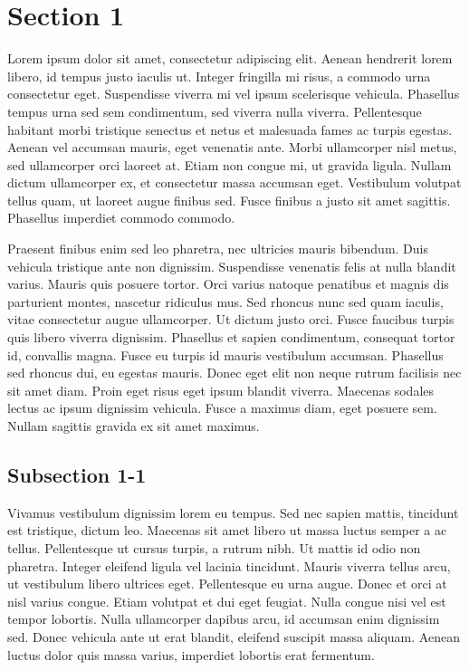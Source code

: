 \section{Section 1}
Lorem ipsum dolor sit amet, consectetur adipiscing elit. Aenean hendrerit lorem libero, id tempus justo iaculis ut. Integer fringilla mi risus, a commodo urna consectetur eget. Suspendisse viverra mi vel ipsum scelerisque vehicula. Phasellus tempus urna sed sem condimentum, sed viverra nulla viverra. Pellentesque habitant morbi tristique senectus et netus et malesuada fames ac turpis egestas. Aenean vel accumsan mauris, eget venenatis ante. Morbi ullamcorper nisl metus, sed ullamcorper orci laoreet at. Etiam non congue mi, ut gravida ligula. Nullam dictum ullamcorper ex, et consectetur massa accumsan eget. Vestibulum volutpat tellus quam, ut laoreet augue finibus sed. Fusce finibus a justo sit amet sagittis. Phasellus imperdiet commodo commodo.

Praesent finibus enim sed leo pharetra, nec ultricies mauris bibendum. Duis vehicula tristique ante non dignissim. Suspendisse venenatis felis at nulla blandit varius. Mauris quis posuere tortor. Orci varius natoque penatibus et magnis dis parturient montes, nascetur ridiculus mus. Sed rhoncus nunc sed quam iaculis, vitae consectetur augue ullamcorper. Ut dictum justo orci. Fusce faucibus turpis quis libero viverra dignissim. Phasellus et sapien condimentum, consequat tortor id, convallis magna. Fusce eu turpis id mauris vestibulum accumsan. Phasellus sed rhoncus dui, eu egestas mauris. Donec eget elit non neque rutrum facilisis nec sit amet diam. Proin eget risus eget ipsum blandit viverra. Maecenas sodales lectus ac ipsum dignissim vehicula. Fusce a maximus diam, eget posuere sem. Nullam sagittis gravida ex sit amet maximus.

\subsection{Subsection 1-1}
Vivamus vestibulum dignissim lorem eu tempus. Sed nec sapien mattis, tincidunt est tristique, dictum leo. Maecenas sit amet libero ut massa luctus semper a ac tellus. Pellentesque ut cursus turpis, a rutrum nibh. Ut mattis id odio non pharetra. Integer eleifend ligula vel lacinia tincidunt. Mauris viverra tellus arcu, ut vestibulum libero ultrices eget. Pellentesque eu urna augue. Donec et orci at nisl varius congue. Etiam volutpat et dui eget feugiat. Nulla congue nisi vel est tempor lobortis. Nulla ullamcorper dapibus arcu, id accumsan enim dignissim sed. Donec vehicula ante ut erat blandit, eleifend suscipit massa aliquam. Aenean luctus dolor quis massa varius, imperdiet lobortis erat fermentum.


